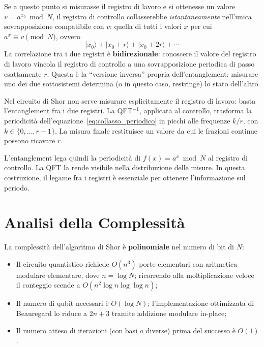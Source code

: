 \begin{onehalfspace}
Se a questo punto si misurasse il registro di lavoro e si ottenesse un valore $v = a^{x_0} \bmod N$, il registro di controllo collasserebbe \textit{istantaneamente} nell'unica sovrapposizione compatibile con $v$: quella di tutti i valori $x$ per cui $a^x \equiv v \pmod{N}$, ovvero
\begin{equation}
    |x_0\rangle + |x_0 + r\rangle + |x_0 + 2r\rangle + \cdots
    \label{eq:collasso_periodico}
\end{equation}
La correlazione tra i due registri è \textbf{bidirezionale}: conoscere il valore del registro di lavoro vincola il registro di controllo a una sovrapposizione periodica di passo esattamente $r$. Questa è la ``versione inversa'' propria dell'entanglement: misurare uno dei due sottosistemi determina (o in questo caso, restringe) lo stato dell'altro.

Nel circuito di Shor non serve misurare esplicitamente il registro di lavoro: basta l'entanglement fra i due registri. La QFT$^{-1}$, applicata al controllo, trasforma la periodicit\`a dell'equazione~\eqref{eq:collasso_periodico} in picchi alle frequenze $k/r$, con $k \in \{0,\ldots,r-1\}$. La misura finale restituisce un valore da cui le frazioni continue possono ricavare $r$.

L'entanglement lega quindi la periodicit\`a di $f(x) = a^x \bmod N$ al registro di controllo. La QFT la rende visibile nella distribuzione delle misure. In questa costruzione, il legame fra i registri è essenziale per ottenere l'informazione sul periodo.

\clearpage
\section{Analisi della Complessità}

La complessità dell'algoritmo di Shor è \textbf{polinomiale} nel numero di bit di $N$:
\begin{itemize}
    \item Il circuito quantistico richiede $O(n^3)$ porte elementari con aritmetica modulare elementare, dove $n = \log N$; ricorrendo alla moltiplicazione veloce il conteggio scende a $O(n^2 \log n \log\log n)$;
    \item Il numero di qubit necessari è $O(\log N)$; l'implementazione ottimizzata di Beauregard \cite{beauregard2002} lo riduce a $2n+3$ tramite addizione modulare in-place;
    \item Il numero atteso di iterazioni (con basi $a$ diverse) prima del successo è $O(1)$.
\end{itemize}


\end{onehalfspace}
